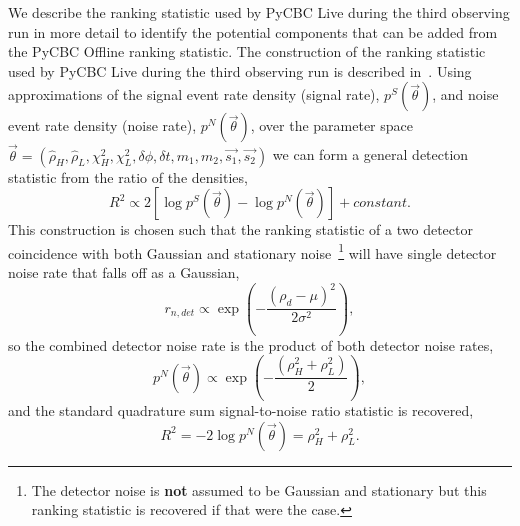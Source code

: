 We describe the ranking statistic used by PyCBC Live during the third observing run in more detail to identify the potential components that can be added from the PyCBC Offline ranking statistic. The construction of the ranking statistic used by PyCBC Live during the third observing run is described in~\cite{PyCBC_Live:2018}. Using approximations of the signal event rate density (signal rate), $p^{S}(\Vec{\theta})$, and noise event rate density (noise rate), $p^{N}(\Vec{\theta})$, over the parameter space $\Vec{\theta} = \left(\hat{\rho}_{H}, \hat{\rho}_{L}, \chi^{2}_{H}, \chi^{2}_{L}, \delta\phi, \delta t, m_{1}, m_{2}, \Vec{s_{1}}, \Vec{s_{2}}\right)$ we can form a general detection statistic from the ratio of the densities,
%
\begin{equation}
    R^{2} \propto 2 [\log p^{S}(\Vec{\theta}) - \log p^{N}(\Vec{\theta})] + constant.
    \label{5:eqn:general-detection-statistic}
\end{equation}
%
This construction is chosen such that the ranking statistic of a two detector coincidence with both Gaussian and stationary noise~\footnote{The detector noise is \textbf{not} assumed to be Gaussian and stationary but this ranking statistic is recovered if that were the case.} will have single detector noise rate that falls off as a Gaussian,
%
\begin{equation}
    r_{n,det} \propto \exp \left( -\frac{(\rho_d - \mu)^2}{2 \sigma^2} \right) ,
    \label{5:eqn:old-noise-rate}
\end{equation}
%
so the combined detector noise rate is the product of both detector noise rates,
%
\begin{equation}
    p^{N}(\Vec{\theta}) \propto \exp \left( -\frac{(\rho_{H}^{2} + \rho_{L}^{2})}{2} \right) ,
    \label{5:eqn:old-comb-noise-rate}
\end{equation}
%
and the standard quadrature sum signal-to-noise ratio statistic is recovered,
%
\begin{equation}
    R^{2} = -2 \log p^{N}(\Vec{\theta}) = \rho^{2}_{H} + \rho^{2}_{L} .
\end{equation}


